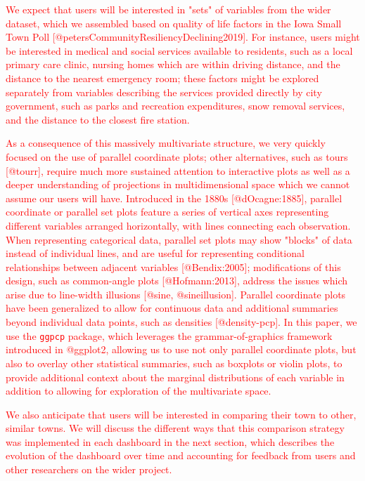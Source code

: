 \documentclass[letterpaper,inpress]{jdsart}
\begin{document}
{\textcolor{red}{We expect that users will be interested in "sets" of variables from the wider dataset, which we assembled based on quality of life factors in the Iowa Small Town Poll [@petersCommunityResiliencyDeclining2019]. For instance, users might be interested in medical and social services available to residents, such as a local primary care clinic, nursing homes which are within driving distance, and the distance to the nearest emergency room; these factors might be explored separately from variables describing the services provided directly by city government, such as parks and recreation expenditures, snow removal services, and the distance to the closest fire station.}}

{\textcolor{red}{As a consequence of this massively multivariate structure, we very quickly focused on the use of parallel coordinate plots; other alternatives, such as tours [@tourr], require much more sustained attention to interactive plots as well as a deeper understanding of projections in multidimensional space which we cannot assume our users will have. Introduced in the 1880s [@dOcagne:1885], parallel coordinate or parallel set plots feature a series of vertical axes representing different variables arranged horizontally, with lines connecting each observation. When representing categorical data, parallel set plots may show "blocks" of data instead of individual lines, and are useful for representing conditional relationships between adjacent variables [@Bendix:2005]; modifications of this design, such as common-angle plots [@Hofmann:2013], address the issues which arise due to line-width illusions [@sine, @sineillusion]. Parallel coordinate plots have been generalized to allow for continuous data and additional summaries beyond individual data points, such as densities [@density-pcp]. In this paper, we use the \texttt{ggpcp} package, which leverages the grammar-of-graphics framework introduced in @ggplot2, allowing us to use not only parallel coordinate plots, but also to overlay other statistical summaries, such as boxplots or violin plots, to provide additional context about the marginal distributions of each variable in addition to allowing for exploration of the multivariate space. }}

{\textcolor{red}{We also anticipate that users will be interested in comparing their town to other, similar towns. We will discuss the different ways that this comparison strategy was implemented in each dashboard in the next section, which describes the evolution of the dashboard over time and accounting for feedback from users and other researchers on the wider project.}}
\end{document}
